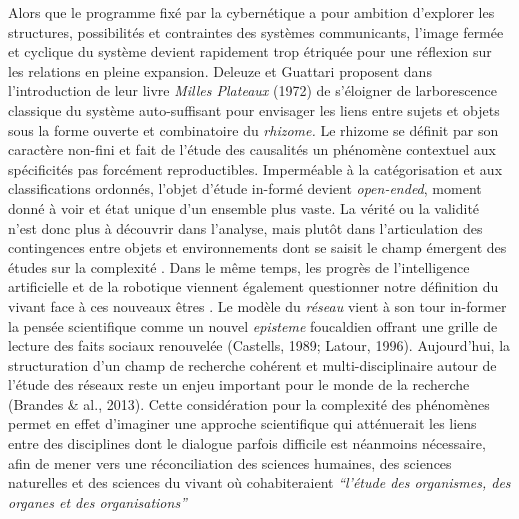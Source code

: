 Alors que le programme fix\'e par la cybern\'etique a pour ambition
d{\textquoteright}explorer les structures, possibilit\'es et
contraintes des syst\`emes communicants, l{\textquoteright}image
ferm\'ee et cyclique du syst\`eme devient rapidement trop \'etriqu\'ee
pour une r\'eflexion sur les relations en pleine expansion. Deleuze et
Guattari proposent dans l{\textquoteright}introduction de leur livre
\textit{Milles Plateaux }(1972) de s{\textquoteright}\'eloigner de
l{\textquotesingle}arborescence classique du syst\`eme auto-suffisant
pour envisager les liens entre sujets et objets sous la forme ouverte
et combinatoire du \textit{rhizome. }Le rhizome se d\'efinit par son
caract\`ere non-fini et fait de l{\textquoteright}\'etude des
causalit\'es un ph\'enom\`ene contextuel aux sp\'ecificit\'es pas
forc\'ement reproductibles. Imperm\'eable \`a la cat\'egorisation et
aux classifications ordonn\'es, l{\textquoteright}objet
d{\textquoteright}\'etude in-form\'e devient \textit{open-ended},
moment donn\'e \`a voir et \'etat unique d{\textquoteright}un ensemble
plus vaste. La v\'erit\'e ou la validit\'e n{\textquoteright}est donc
plus \`a d\'ecouvrir dans l{\textquoteright}analyse, mais plut\^ot dans
l{\textquoteright}articulation des contingences entre objets et
environnements dont se saisit le champ \'emergent des \'etudes sur la
complexit\'e \cite{Morin2005}. Dans le m\^eme temps, les progr\`es de
l{\textquoteright}intelligence artificielle et de la robotique viennent
\'egalement questionner notre d\'efinition du vivant face \`a ces
nouveaux \^etres \cite{Hofstadter1999}. Le mod\`ele du \textit{r\'eseau
}vient \`a son tour in-former la pens\'ee scientifique comme un nouvel
\textit{episteme }foucaldien offrant une grille de lecture des faits
sociaux renouvel\'ee (Castells, 1989; Latour, 1996).
Aujourd{\textquoteright}hui, la structuration d{\textquoteright}un
champ de recherche coh\'erent et multi-disciplinaire autour de
l{\textquoteright}\'etude des r\'eseaux reste un enjeu important pour
le monde de la recherche (Brandes \& al., 2013). Cette consid\'eration
pour la complexit\'e des ph\'enom\`enes permet en effet
d{\textquoteright}imaginer une approche scientifique qui att\'enuerait
les liens entre des disciplines dont le dialogue parfois difficile est
n\'eanmoins n\'ecessaire, afin de mener vers une r\'econciliation des
sciences humaines, des sciences naturelles et des sciences du vivant
o\`u cohabiteraient
\textit{{\textquotedblleft}l{\textquoteright}\'etude des organismes,
des organes et des organisations{\textquotedblright} }\cite{Morin2005}

